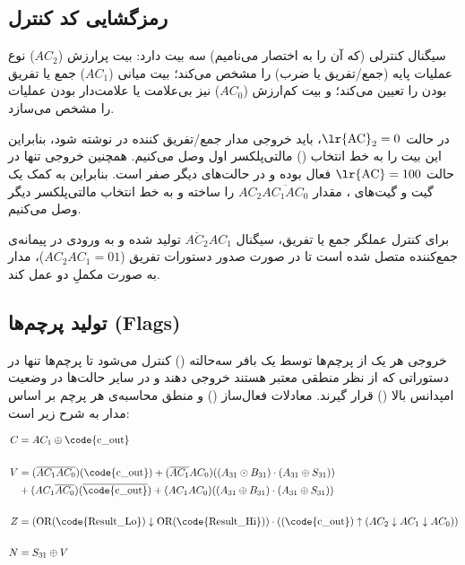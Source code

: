 \subsection{رمزگشایی کد کنترل}
سیگنال کنترلی  (که آن را به اختصار  می‌نامیم) سه بیت دارد: بیت پرارزش ($AC_2$) نوع عملیات پایه (جمع/تفریق یا ضرب) را مشخص می‌کند؛ بیت میانی ($AC_1$) جمع یا تفریق بودن را تعیین می‌کند؛ و بیت کم‌ارزش ($AC_0$) نیز بی‌علامت یا علامت‌دار بودن عملیات را مشخص می‌سازد.

در حالت $\text{\lr{AC}}_2 = 0$، باید خروجی مدار جمع/تفریق کننده در  نوشته شود، بنابراین این بیت را به خط انتخاب () مالتی‌پلکسر اول وصل می‌کنیم. همچنین خروجی  تنها در حالت $\text{\lr{AC}} = 100$ فعال بوده و در حالت‌های دیگر صفر است. بنابراین به کمک یک گیت  و گیت‌های ، مقدار ${AC}_2\overline{{AC}_1{AC}_0}$ را ساخته و به خط انتخاب مالتی‌پلکسر دیگر وصل می‌کنیم.

برای کنترل عملگر جمع یا تفریق، سیگنال $\overline{AC_2}AC_1$ تولید شده و به ورودی  در پیمانه‌ی جمع‌کننده متصل شده است تا در صورت صدور دستورات تفریق ($AC_2AC_1 = 01$)، مدار به صورت مکملِ دو عمل کند.

\subsection{تولید پرچم‌ها (Flags)}
خروجی هر یک از پرچم‌ها توسط یک بافر سه‌حالته () کنترل می‌شود تا پرچم‌ها تنها در دستوراتی که از نظر منطقی معتبر هستند خروجی دهند و در سایر حالت‌ها در وضعیت امپدانس بالا () قرار گیرند. معادلات فعال‌ساز () و منطق محاسبه‌ی هر پرچم بر اساس مدار به شرح زیر است:

\begin{align*}
    C & = AC_1 \oplus \text{\code{c\_out}}                                                                                                                                    \\
    \\
    V & = (\overline{AC_1AC_0})(\text{\code{c\_out}}) + (\overline{AC_1}AC_0)((A_{31} \odot B_{31}) \cdot (A_{31} \oplus S_{31}))                                             \\
      & + ({AC_1}\overline{AC_0})(\overline{\text{\code{c\_out}}}) + ({AC_1AC_0})((A_{31} \oplus B_{31}) \cdot (A_{31} \oplus S_{31}))                                        \\
    \\
    Z & = (\text{OR}(\text{\code{Result\_Lo}}) \downarrow \text{OR}(\text{\code{Result\_Hi}})) \cdot ((\text{\code{c\_out}}) \uparrow (AC_2 \downarrow AC_1 \downarrow AC_0)) \\
    \\
    N & = S_{31} \oplus V
\end{align*}

